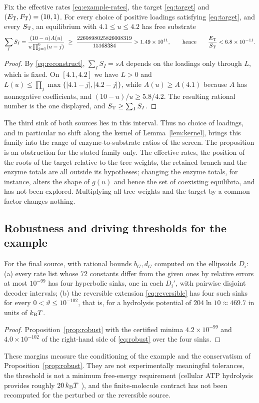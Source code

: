 \begin{proposition}\label{prop:obstruction}
Fix the effective rates \eqref{eq:example-rates}, the target \eqref{eq:target} and
\((E_{\mathrm T},F_{\mathrm T})=(10,1)\). For every choice of positive loadings satisfying \eqref{eq:target}, and
every \(S_{\mathrm T}\), an equilibrium with \(4.1\le u\le4.2\) has free substrate
\[
 \sum_IS_I=\frac{(10-u)A(u)}{u\prod_{j=1}^6(u-j)}
 \ \ge\ \frac{2260898025826008319}{15168384}>1.49\times10^{11},
 \qquad\text{hence}\qquad \frac{E_{\mathrm T}}{S_{\mathrm T}}<6.8\times10^{-11}.
\]
\end{proposition}
\begin{proof}
By \eqref{eq:reconstruct}, \(\sum_IS_I=sA\) depends on the loadings only through \(L\), which is
fixed. On \([4.1,4.2]\) we have \(L>0\) and
\(L(u)\le\prod_j\max\{|4.1-j|,|4.2-j|\}\), while \(A(u)\ge A(4.1)\) because \(A\) has
nonnegative coefficients, and \((10-u)/u\ge5.8/4.2\). The resulting rational number is the one
displayed, and \(S_{\mathrm T}\ge\sum_IS_I\).
\end{proof}
The third sink of both sources lies in this interval. Thus no choice of loadings, and in
particular no shift along the kernel of Lemma~\ref{lem:kernel}, brings this family into the
range of enzyme-to-substrate ratios of the screen. The proposition is an obstruction for the
stated family only. The effective rates, the position of the roots of the target relative to
the tree weights, the retained branch and the enzyme totals are all outside its hypotheses;
changing the enzyme totals, for instance, alters the shape of \(g(u)\) and hence the set of
coexisting equilibria, and has not been explored. Multiplying all tree weights and the target
by a common factor changes nothing.

\subsection{Robustness and driving thresholds for the example}
\begin{proposition}\label{prop:example-robust}
For the final source, with rational bounds \(b_G,d_G\) computed on the ellipsoids \(D_i\):
\textup{(a)} every rate list whose \(72\) constants differ from the given ones by relative
errors at most \(10^{-99}\) has four hyperbolic sinks, one in each \(D_i'\), with pairwise
disjoint decoder intervals; \textup{(b)} the reversible extension \eqref{eq:reversible} has
four such sinks for every \(0<\vartheta\le10^{-102}\), that is, for a hydrolysis potential of
\(204\ln10\approx469.7\) in units of \(k_{\mathrm B} T\).
\end{proposition}
\begin{proof}
Proposition~\ref{prop:robust} with the certified minima \(4.2\times10^{-99}\) and
\(4.0\times10^{-102}\) of the right-hand side of \eqref{eq:robust} over the four sinks.
\end{proof}
These margins measure the conditioning of the example and the conservatism of
Proposition~\ref{prop:robust}. They are not experimentally meaningful tolerances, the threshold
is not a minimum free-energy requirement (cellular ATP hydrolysis provides roughly
\(20\,k_{\mathrm B} T\) \cite{Qian2007}), and the finite-molecule contract has not been recomputed for
the perturbed or the reversible source.

